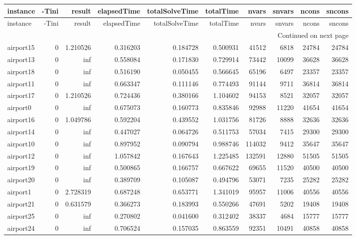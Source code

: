 \documentclass[../../../thesis.tex]{subfiles}
\begin{document}
\tiny
\begin{longtable}{|l|r|r|r|r|r|r|r|r|r|}
\toprule
instance & -Tini & result & elapsedTime & totalSolveTime & totalTime & nvars & snvars & ncons & sncons \\
\midrule
\endfirsthead
\toprule
instance & -Tini & result & elapsedTime & totalSolveTime & totalTime & nvars & snvars & ncons & sncons \\
\midrule
\endhead
\midrule
\multicolumn{10}{r}{Continued on next page} \\
\midrule
\endfoot
\bottomrule
\endlastfoot
airport15 & 0 & 1.210526 & 0.316203 & 0.184728 & 0.500931 & 41512 & 6818 & 24784 & 24784 \\
airport13 & 0 & inf & 0.558084 & 0.171830 & 0.729914 & 73442 & 10099 & 36628 & 36628 \\
airport18 & 0 & inf & 0.516190 & 0.050455 & 0.566645 & 65196 & 6497 & 23357 & 23357 \\
airport11 & 0 & inf & 0.663347 & 0.111146 & 0.774493 & 91144 & 9711 & 36814 & 36814 \\
airport17 & 0 & 1.210526 & 0.724436 & 0.380166 & 1.104602 & 94153 & 8521 & 32057 & 32057 \\
airport0 & 0 & inf & 0.675073 & 0.160773 & 0.835846 & 92988 & 11220 & 41654 & 41654 \\
airport16 & 0 & 1.049786 & 0.592204 & 0.439552 & 1.031756 & 81726 & 8888 & 32636 & 32636 \\
airport14 & 0 & inf & 0.447027 & 0.064726 & 0.511753 & 57034 & 7415 & 29300 & 29300 \\
airport10 & 0 & inf & 0.897952 & 0.090794 & 0.988746 & 114032 & 9412 & 35647 & 35647 \\
airport12 & 0 & inf & 1.057842 & 0.167643 & 1.225485 & 132591 & 12880 & 51505 & 51505 \\
airport19 & 0 & inf & 0.500865 & 0.166757 & 0.667622 & 69655 & 11520 & 40500 & 40500 \\
airport20 & 0 & inf & 0.389709 & 0.105087 & 0.494796 & 53071 & 7235 & 25282 & 25282 \\
airport1 & 0 & 2.728319 & 0.687248 & 0.653771 & 1.341019 & 95957 & 11006 & 40556 & 40556 \\
airport21 & 0 & 0.631579 & 0.366273 & 0.183993 & 0.550266 & 47691 & 5202 & 19408 & 19408 \\
airport25 & 0 & inf & 0.270802 & 0.041600 & 0.312402 & 38337 & 4684 & 15777 & 15777 \\
airport24 & 0 & inf & 0.706524 & 0.157035 & 0.863559 & 92351 & 10491 & 40858 & 40858 \\

\end{longtable}
\end{document}
